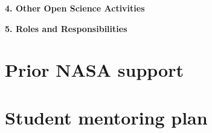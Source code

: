 \documentclass[12pt]{article}
\newcommand{\paragraphskip}{\medskip}
\renewcommand{\paragraph}[1]{\par\paragraphskip\noindent\textbf{#1}}
\begin{document}
\paragraph{4. Other Open Science Activities}

\paragraph{5. Roles and Responsibilities}

\clearpage
\section*{Prior NASA support}

\section*{Student mentoring plan}
\end{document}

